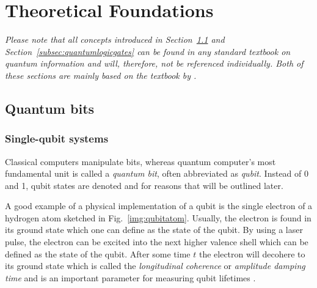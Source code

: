 \chapter{Theoretical Foundations}\label{sec:theory}
\emph{Please note that all concepts introduced in Section~\ref{subsec:qubits} and Section~\ref{subsec:quantumlogicgates} can be found in any standard textbook on quantum information and will, therefore, not be referenced individually. Both of these sections are mainly based on the textbook by .}
\section{Quantum bits}
\label{subsec:qubits}
\subsection{Single-qubit systems}
\label{subsubsec:qubits}
Classical computers manipulate bits, whereas quantum computer's most fundamental unit is called a \emph{quantum bit}, often abbreviated as \emph{qubit}. Instead of 0 and 1, qubit states are denoted \0 and \1 for reasons that will be outlined later.

A good example of a physical implementation of a qubit is the single electron of a hydrogen atom sketched in Fig.~\ref{img:qubitatom}. Usually, the electron is found in its ground state which one can define as the \0 state of the qubit. By using a laser pulse, the electron can be excited into the next higher valence shell which can be defined as the \1 state of the qubit. After some time $t$ the electron will decohere to its ground state \0 which is called the \emph{longitudinal coherence} or \emph{amplitude damping time} and is an important parameter for measuring qubit lifetimes \cite{chuanglecturenotes}.

